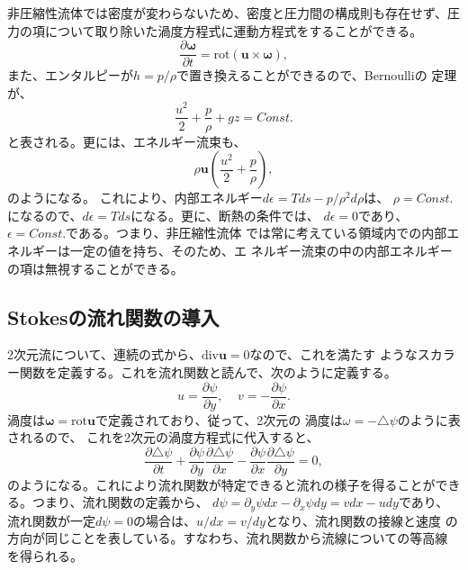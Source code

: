 非圧縮性流体では密度が変わらないため、密度と圧力間の構成則も存在せず、圧
力の項について取り除いた渦度方程式に運動方程式をすることができる。
\begin{equation}
 \frac{\partial\bm{\omega}}{\partial t}
  = \text{rot} \left(\bm{u}\times\bm{\omega}\right),
\end{equation}
また、エンタルピーが$h=p/\rho$で置き換えることができるので、Bernoulliの
定理が、
\begin{equation}
 \frac{u^2}{2} + \frac{p}{\rho} + gz = Const.
\end{equation}
と表される。更には、エネルギー流束も、
\begin{equation}
 \rho \bm{u}
  \left(\frac{u^2}{2} + \frac{p}{\rho}\right),
\end{equation}
のようになる。
これにより、内部エネルギー$d\epsilon = Tds - p/\rho^2d\rho$は、
$\rho = Const.$になるので、$d\epsilon = Tds$になる。更に、断熱の条件では、
$d\epsilon = 0$であり、$\epsilon = Const.$である。つまり、非圧縮性流体
では常に考えている領域内での内部エネルギーは一定の値を持ち、そのため、エ
ネルギー流束の中の内部エネルギーの項は無視することができる。

\subsection{Stokesの流れ関数の導入}
2次元流について、連続の式から、$\text{div}\bm{u}=0$なので、これを満たす
ようなスカラー関数を定義する。これを流れ関数と読んで、次のように定義する。
\begin{equation}
 u = \frac{\partial \psi}{\partial y},  \mspace{20mu}
  v = -\frac{\partial \psi}{\partial x}.
\end{equation}
渦度は$\bm{\omega} = \text{rot}\bm{u}$で定義されており、従って、2次元の
渦度は$\omega=-\triangle\psi$のように表されるので、
これを2次元の渦度方程式に代入すると、
\begin{equation}
 \frac{\partial \triangle\psi}{\partial t}
  +\frac{\partial \psi}{\partial y}
  \frac{\partial\triangle\psi}{\partial x}
  -\frac{\partial \psi}{\partial x}
  \frac{\partial\triangle\psi}{\partial y}
  = 0,
\end{equation}
のようになる。これにより流れ関数が特定できると流れの様子を得ることができ
る。つまり、流れ関数の定義から、
$d\psi = \partial_y\psi dx-\partial_x\psi dy = vdx - u dy$であり、
流れ関数が一定$d\psi = 0$の場合は、$u/dx = v/dy$となり、流れ関数の接線と速度
の方向が同じことを表している。すなわち、流れ関数から流線についての等高線
を得られる。


